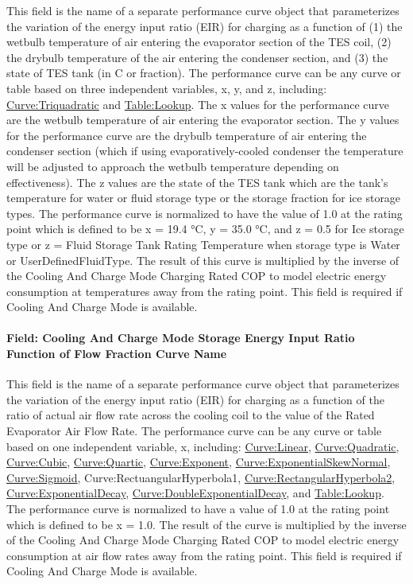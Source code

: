This field is the name of a separate performance curve object that parameterizes the variation of the energy input ratio (EIR) for charging as a function of (1) the wetbulb temperature of air entering the evaporator section of the TES coil, (2) the drybulb temperature of the air entering the condenser section, and (3) the state of TES tank (in C or fraction). The performance curve can be any curve or table based on three independent variables, x, y, and z, including: \hyperref[curvetriquadratic]{Curve:Triquadratic} and \hyperref[tablelookup]{Table:Lookup}. The x values for the performance curve are the wetbulb temperature of air entering the evaporator section. The y values for the performance curve are the drybulb temperature of air entering the condenser section (which if using evaporatively-cooled condenser the temperature will be adjusted to approach the wetbulb temperature depending on effectiveness). The z values are the state of the TES tank which are the tank's temperature for water or fluid storage type or the storage fraction for ice storage types. The performance curve is normalized to have the value of 1.0 at the rating point which is defined to be x = 19.4 °C, y = 35.0 °C, and z = 0.5 for Ice storage type or z = Fluid Storage Tank Rating Temperature when storage type is Water or UserDefinedFluidType. The result of this curve is multiplied by the inverse of the Cooling And Charge Mode Charging Rated COP to model electric energy consumption at temperatures away from the rating point. This field is required if Cooling And Charge Mode is available.

\paragraph{Field: Cooling And Charge Mode Storage Energy Input Ratio Function of Flow Fraction Curve Name}\label{field-cooling-and-charge-mode-storage-energy-input-ratio-function-of-flow-fraction-curve-name}

This field is the name of a separate performance curve object that parameterizes the variation of the energy input ratio (EIR) for charging as a function of the ratio of actual air flow rate across the cooling coil to the value of the Rated Evaporator Air Flow Rate. The performance curve can be any curve or table based on one independent variable, x, including: \hyperref[curvelinear]{Curve:Linear}, \hyperref[curvequadratic]{Curve:Quadratic}, \hyperref[curvecubic]{Curve:Cubic}, \hyperref[curvequartic]{Curve:Quartic}, \hyperref[curveexponent]{Curve:Exponent}, \hyperref[curveexponentialskewnormal]{Curve:ExponentialSkewNormal}, \hyperref[curvesigmoid]{Curve:Sigmoid}, Curve:RectuangularHyperbola1, \hyperref[curverectangularhyperbola2]{Curve:RectangularHyperbola2}, \hyperref[curveexponentialdecay]{Curve:ExponentialDecay}, \hyperref[curvedoubleexponentialdecay]{Curve:DoubleExponentialDecay}, and \hyperref[tablelookup]{Table:Lookup}. The performance curve is normalized to have a value of 1.0 at the rating point which is defined to be x = 1.0. The result of the curve is multiplied by the inverse of the Cooling And Charge Mode Charging Rated COP to model electric energy consumption at air flow rates away from the rating point. This field is required if Cooling And Charge Mode is available.

